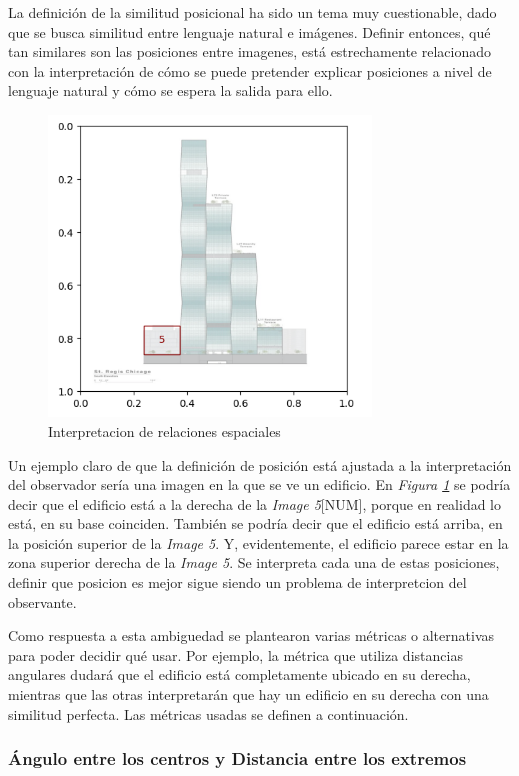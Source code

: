 La definición de la similitud posicional ha sido un tema muy cuestionable, dado que se busca similitud entre lenguaje natural e imágenes. Definir entonces, qu\'e tan similares son las posiciones entre imagenes, está estrechamente relacionado con la interpretación de cómo se puede pretender explicar posiciones a nivel de lenguaje natural y cómo se espera la salida para ello.

\begin{figure}[H]
\centering
\includegraphics[height=80mm]{Graphics/building.png}
\caption{Interpretacion de relaciones espaciales}
\label{fig:edificio}
\end{figure}

Un ejemplo claro de que la definición de posición está ajustada a la interpretación del observador sería una imagen en la que se ve un edificio. En \textit{Figura \ref{fig:edificio}} se podría decir que el edificio está a la derecha de la \textit{Image 5}[NUM], porque en realidad lo está, en su base coinciden. También se podría decir que el edificio está arriba, en la posición superior de la \textit{Image 5}. Y, evidentemente, el edificio parece estar en la zona superior derecha de la \textit{Image 5}. Se interpreta cada una de estas posiciones, definir que posicion es mejor sigue siendo un problema de interpretcion del observante.

Como respuesta a esta ambiguedad se plantearon varias métricas o alternativas para poder decidir qué usar. Por ejemplo, la métrica que utiliza distancias angulares dudará que el edificio está completamente ubicado en su derecha, mientras que las otras interpretarán que hay un edificio en su derecha con una similitud perfecta. Las métricas usadas se definen a continuación.

\subsubsection{Ángulo entre los centros y Distancia entre los extremos}

